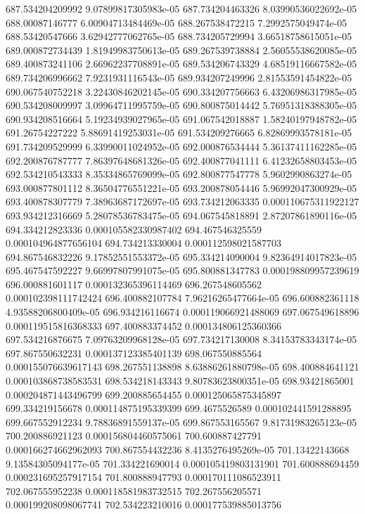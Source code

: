 {687.534204209992 9.07899817305983e-05
687.734204463326 8.03990536022692e-05
688.00087146777 6.00904713484469e-05
688.267538472215 7.2992575049474e-05
688.53420547666 3.62942777062765e-05
688.734205729994 3.66518758615051e-05
689.000872734439 1.81949983750613e-05
689.267539738884 2.56055538620085e-05
689.400873241106 2.66962237708891e-05
689.534206743329 4.68519116667582e-05
689.734206996662 7.9231931116543e-05
689.934207249996 2.81553591454822e-05
690.067540752218 3.22430846202145e-05
690.334207756663 6.43206986317985e-05
690.534208009997 3.09964711995759e-05
690.800875014442 5.76951318388305e-05
690.934208516664 5.19234939027965e-05
691.067542018887 1.58240197948782e-05
691.26754227222 5.88691419253031e-05
691.534209276665 6.82869993578181e-05
691.734209529999 6.33990011024952e-05
692.000876534444 5.36137411162285e-05
692.200876787777 7.86397648681326e-05
692.400877041111 6.41232658803453e-05
692.534210543333 8.35334865769099e-05
692.800877547778 5.9602990863274e-05
693.000877801112 8.36504776551221e-05
693.200878054446 5.96992047300929e-05
693.400878307779 7.38963687172697e-05
693.734212063335 0.000110675311922127
693.934212316669 5.28078536783475e-05
694.067545818891 2.87207861890116e-05
694.334212823336 0.000105582330987402
694.467546325559 0.000104964877656104
694.734213330004 0.000112598021587703
694.867546832226 9.17852551553372e-05
695.334214090004 9.82364914017823e-05
695.467547592227 9.66997807991075e-05
695.800881347783 0.000198809957239619
696.000881601117 0.000132365396114469
696.267548605562 0.000102398111742424
696.400882107784 7.96216265477664e-05
696.600882361118 4.93588206800409e-05
696.934216116674 0.000119066921488069
697.067549618896 0.000119515816368333
697.400883374452 0.000134806125360366
697.534216876675 7.09763209968128e-05
697.734217130008 8.34153783343174e-05
697.867550632231 0.000137123385401139
698.067550885564 0.000155076639617143
698.267551138898 8.63886261880798e-05
698.400884641121 0.000103868738583531
698.534218143343 9.80783623800351e-05
698.93421865001 0.000204871443496799
699.200885654455 0.000125065875345897
699.334219156678 0.000114875195339399
699.4675526589 0.000102441591288895
699.667552912234 9.78836891559137e-05
699.867553165567 9.81731983265123e-05
700.200886921123 0.000156804460575061
700.600887427791 0.000166274662962093
700.867554432236 8.4135276495269e-05
701.13422143668 9.13584305094177e-05
701.334221690014 0.000105419803131901
701.600888694459 0.000231695257917154
701.800888947793 0.000170111086523911
702.067555952238 0.000118581983732515
702.267556205571 0.000199208098067741
702.534223210016 0.000177539885013756
}
